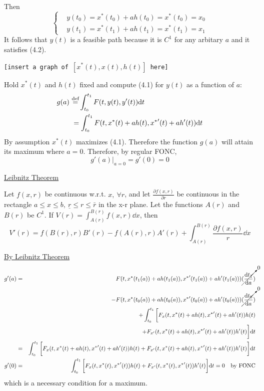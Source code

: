 \documentclass[twoside]{article}
\newcommand\pp{\partial}
\begin{document}
Then
\begin{equation}
    \begin{cases}
        & y(t_0) = x^*(t_0) + a h(t_0) = x^*(t_0) = x_0\\
        & y(t_1) = x^*(t_1) + a h(t_1) = x^*(t_1) = x_1
    \end{cases}
\end{equation}
It follows that $y(t)$ is a feasible path because it is $C^{1}$ for any arbitary $a$ and it satisfies (4.2).
\begin{center}
    \texttt{[insert a graph of $[x^*(t), x(t), h(t)]$ here]}
\end{center}

Hold $x^*(t)$ and $h(t)$ fixed and compute (4.1) for $y(t)$ as a function of $a$:
\begin{equation}
    \begin{aligned}
        g(a)~
        &{\buildrel \text{def} \over =} \int_{t_0}^{t_1} F(t,y(t),y'(t)) \dd t\\
        &= \int_{t_0}^{t_1} F(t,x^*(t) + a h(t),{x^*}'(t) + a h'(t)) \dd t
    \end{aligned}
\end{equation}
By assumption $x^*(t)$ maximizes (4.1). Therefore the function $g(a)$ will attain its maximum where $a = 0$. Therefore, by regular FONC,
\begin{equation}
    g'(a) \bigg |_{a = 0} = g'(0) = 0
\end{equation}

\underline{Leibnitz Theorem}

Let $f(x,r)$ be continuous w.r.t. $x, ~ \forall r$, and let $\frac{\pp f(x,r)}{\pp r}$ be continuous in the rectangle $a \leq x \leq b, ~ \underline{r} \leq r \leq \bar{r}$ in the x-r plane. Let the functions $A(r)$ and $B(r)$ be $C^1$. If $V(r) = \int_{A(r)}^{B(r)} f(x,r) \dd x$, then \begin{equation}
    V'(r) = f(B(r),r) B'(r) - f(A(r), r) A'(r) + \int_{A(r)}^{B(r)} \frac{\pp f(x,r)}{r} \dd x
\end{equation}

\underline{By Leibnitz Theorem}
\begin{eqnarray}
    g'(a) &=& ~~ F(t,x^*(t_1(a))+ a h(t_1(a)), {x^*}'(t_1(a))+ a h'(t_1(a))) \cancelto{0}{(\frac{\mathrm{d} t_1}{\mathrm{d} a})}\notag \\
    && -F(t,x^*(t_0(a))+ a h(t_0(a)), {x^*}'(t_0(a))+ a h'(t_0(a))) \cancelto{0}{(\frac{\mathrm{d} t_0}{\mathrm{d} a})}\notag \\
    && + \int_{t_0}^{t_1} \bigg [ 
    F_x(t,x^*(t)+ a h(t), {x^*}'(t)+ a h'(t)) h(t) \notag \\
    && + F_{x'}( t, x^*(t)+ a h(t), {x^*}'(t)+ a h'(t) ) h'(t)
    \bigg ] \mathrm{d} t \notag \\
    &=& \int_{t_0}^{t_1} \bigg [ 
    F_x(t,x^*(t)+ a h(t), {x^*}'(t)+ a h'(t)) h(t) + F_{x'}(t,x^*(t)+ a h(t), {x^*}'(t)+ a h'(t)) h'(t)
    \bigg ] \mathrm{d} t\\
    g'(0) &=& \int_{t_0}^{t_1} \bigg [ 
    F_x(t,x^*(t), {x^*}'(t)) h(t) + F_{x'}(t,x^*(t), {x^*}'(t)) h'(t)
    \bigg ] \mathrm{d} t = 0 \quad \text{by FONC} 
\end{eqnarray}
which is a necessary condition for a maximum.
\end{document}
